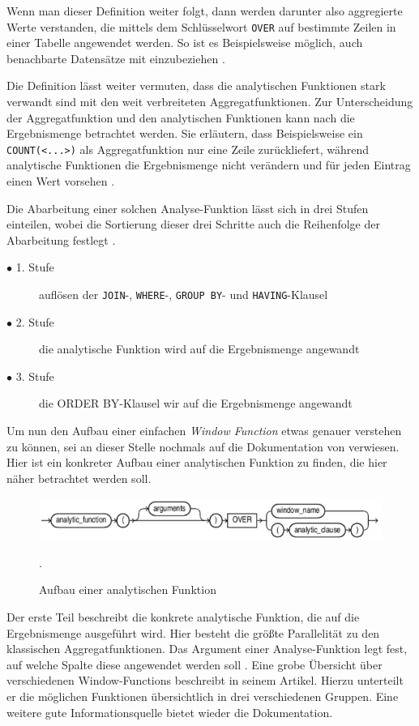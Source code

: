 Wenn man dieser Definition weiter folgt, dann werden darunter also aggregierte
Werte verstanden, die mittels dem Schlüsselwort \texttt{OVER} auf bestimmte
Zeilen in einer Tabelle angewendet werden. So ist es Beispielsweise möglich,
auch benachbarte Datensätze mit einzubeziehen \citep[vgl.][]{oracle}.

Die Definition lässt weiter vermuten, dass die analytischen Funktionen stark
verwandt sind mit den weit verbreiteten Aggregatfunktionen. Zur Unterscheidung der
Aggregatfunktion und den analytischen Funktionen kann nach \citet[S. 36]{Nuijten2023}
die Ergebnismenge betrachtet werden. Sie erläutern, dass Beispielsweise ein
\texttt{COUNT(<...>)} als Aggregatfunktion nur eine Zeile zurückliefert, während
analytische Funktionen die Ergebnismenge nicht verändern und für jeden Eintrag
einen Wert vorsehen \citep[vgl.][S. 36]{Nuijten2023}.

Die Abarbeitung einer solchen Analyse-Funktion lässt sich in drei Stufen einteilen,
wobei die Sortierung dieser drei Schritte auch die Reihenfolge der Abarbeitung
festlegt \citep[vgl.][S. 35]{Nuijten2023}.
\begin{description}
	\item[$\bullet$ 1. Stufe] auflösen der \texttt{JOIN}-, \texttt{WHERE}-, \texttt{GROUP
		BY}- und \texttt{HAVING}-Klausel

	\item[$\bullet$ 2. Stufe] die analytische Funktion wird auf die Ergebnismenge angewandt

	\item[$\bullet$ 3. Stufe] die ORDER BY-Klausel wir auf die Ergebnismenge angewandt
\end{description}
Um nun den Aufbau einer einfachen \textit{Window Function} etwas genauer verstehen
zu können, sei an dieser Stelle nochmals auf die Dokumentation von \citet{oracle}
verwiesen. Hier ist ein konkreter Aufbau einer analytischen Funktion zu finden, die
hier näher betrachtet werden soll.
\begin{figure}[h]
	\centering
	\includegraphics[scale=0.5]{img/aufbauAnalyticFunction.jpg}
	\caption{ Aufbau einer analytischen Funktion \citep[vgl.][]{oracle}}
	. \label{fig:aufbauAnalyticFunction}
\end{figure}
Der erste Teil beschreibt die konkrete analytische Funktion, die auf die Ergebnismenge
ausgeführt wird. Hier besteht die größte Parallelität zu den klassischen
Aggregatfunktionen. Das Argument einer Analyse-Funktion legt fest, auf welche
Spalte diese angewendet werden soll \citep[vgl.][S.~110]{schicker2017datenbanken}.
Eine grobe Übersicht über verschiedenen Window-Functions beschreibt \citet[]{ibrahaim23}
in seinem Artikel. Hierzu unterteilt er die möglichen Funktionen übersichtlich
in drei verschiedenen Gruppen. Eine weitere gute Informationsquelle bietet wieder
die \citet{oracle} Dokumentation.

